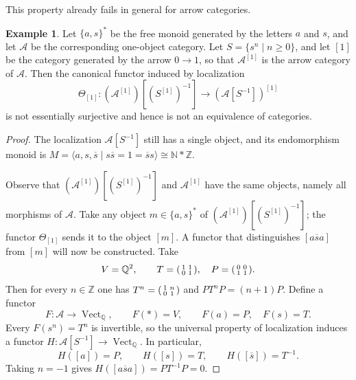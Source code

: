 \documentclass[10pt,a4paper]{amsart}
\theoremstyle{plain}
\theoremstyle{definition}
\newtheorem{example}[theorem]{Example}
\theoremstyle{remark}
\begin{document}
This property already fails in general for arrow categories.

\begin{example}\label{ex:morphism-category-localization}
  Let $\{a,s\}^*$ be the free monoid generated by the letters $a$ and $s$, and let $\mathcal A$ be the corresponding one-object category.
  Let $S=\{s^n\mid n\geq0\}$, and let $[1]$ be the category generated by the arrow $0\longrightarrow1$, so that $\mathcal A^{[1]}$ is the arrow category of $\mathcal A$.
  Then the canonical functor induced by localization
  \[
    \Theta_{[1]}:
    (\mathcal A^{[1]})[(S^{[1]})^{-1}]
    \longrightarrow
    (\mathcal A[S^{-1}])^{[1]}
  \]
  is not essentially surjective and hence is not an equivalence of categories.
\end{example}

\begin{proof}
  The localization $\mathcal A[S^{-1}]$ still has a single object, and its endomorphism monoid is $M=\langle a,s,\overline s\mid s\overline s=1=\overline s s\rangle \cong\mathbb N*\mathbb Z$.

  Observe that $(\mathcal A^{[1]})[(S^{[1]})^{-1}]$ and $\mathcal A^{[1]}$ have the same objects, namely all morphisms of $\mathcal{A}$.
  Take any object $m\in\{a,s\}^*$ of $(\mathcal A^{[1]})[(S^{[1]})^{-1}]$; the functor $\Theta_{[1]}$ sends it to the object $[m]$.
  A functor that distinguishes $[a\overline s a]$ from $[m]$ will now be constructed.
  Take
  \[
    V=\mathbb Q^2, \qquad T=\begin{psmallmatrix}1&1\\0&1\end{psmallmatrix}, \quad P=\begin{psmallmatrix}0&0\\1&1\end{psmallmatrix}.
  \]
  Then for every $n\in\mathbb Z$ one has $T^n=\begin{psmallmatrix}1&n\\0&1\end{psmallmatrix}$ and $PT^nP=(n+1)P$.
  Define a functor
  \[
    F:\mathcal A\longrightarrow\operatorname{Vect}_{\mathbb Q}, \qquad F(*)=V,
    \qquad F(a)=P,
    \quad F(s)=T.
  \]
  Every $F(s^n)=T^n$ is invertible, so the universal property of localization induces a functor $H:\mathcal A[S^{-1}]\longrightarrow \operatorname{Vect}_{\mathbb Q}$.
  In particular,
  \[
    H([a])=P,
    \qquad H([s])=T,
    \qquad H([\overline s])=T^{-1}.
  \]
  Taking $n=-1$ gives $H([a\overline s a])=PT^{-1}P=0$.


\end{proof}
\end{document}
